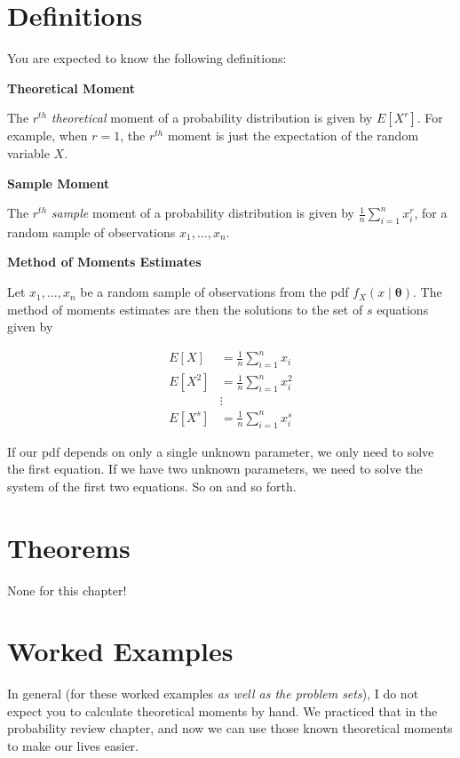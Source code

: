 \documentclass[
  letterpaper,
  DIV=11,
  numbers=noendperiod]{scrreprt}
\begin{document}
\section{Definitions}\label{definitions-2}

You are expected to know the following definitions:

\textbf{Theoretical Moment}

The \(r^{th}\) \emph{theoretical} moment of a probability distribution
is given by \(E[X^r]\). For example, when \(r = 1\), the \(r^{th}\)
moment is just the expectation of the random variable \(X\).

\textbf{Sample Moment}

The \(r^{th}\) \emph{sample} moment of a probability distribution is
given by \(\frac{1}{n} \sum_{i = 1}^n x_i^r\), for a random sample of
observations \(x_1, \dots, x_n\).

\textbf{Method of Moments Estimates}

Let \(x_1, \dots, x_n\) be a random sample of observations from the pdf
\(f_X(x \mid \boldsymbol{\theta})\). The method of moments estimates are
then the solutions to the set of \(s\) equations given by

\begin{align*}
  E[X] & = \frac{1}{n} \sum_{i = 1}^n x_i \\
  E[X^2] & = \frac{1}{n} \sum_{i = 1}^n x_i^2 \\
  & \vdots \\
  E[X^s] & = \frac{1}{n} \sum_{i = 1}^n x_i^s
\end{align*}

If our pdf depends on only a single unknown parameter, we only need to
solve the first equation. If we have two unknown parameters, we need to
solve the system of the first two equations. So on and so forth.

\section{Theorems}\label{theorems-2}

None for this chapter!

\section{Worked Examples}\label{worked-examples-2}

In general (for these worked examples \emph{as well as the problem
sets}), I do not expect you to calculate theoretical moments by hand. We
practiced that in the probability review chapter, and now we can use
those known theoretical moments to make our lives easier.
\end{document}
